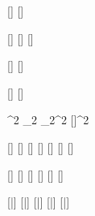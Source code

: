 

\varDef{\angleTwo}{\beta}
\varDef{\angleOne}{\alpha}
\varDef{\angleFour}{\Pi}
\varDef{\angleThree}{\Gamma}

[\mathbb]
[\mathbb]

[\mathcal]
[\mathcal]
[\mathbb]

[\mathcal]
[\mathcal]

[\vectorFmt]
[\unitVecFmt]

^{2}
_{2}
_{2}^{2}
[\vectorFmt]^{2}

\varDef{\rbardot}{\rbar}[\dot]
\varDef{\rbarddot}{\rbar}[\ddot]
[\dot]
\varDef{\thetadot}{\theta}[\dot]
[\ddot]
[\ddot]
[\ddot]

[\hat]
[\hat]
[\hat]
[\hat]
[\hat]
[\hat]

[\bar]
[\bar]
[\bar]
[\bar]
[\bar]
